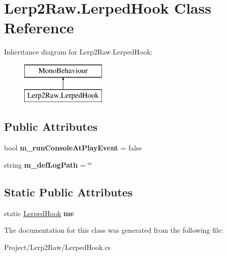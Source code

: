 \hypertarget{class_lerp2_raw_1_1_lerped_hook}{}\section{Lerp2\+Raw.\+Lerped\+Hook Class Reference}
\label{class_lerp2_raw_1_1_lerped_hook}
Inheritance diagram for Lerp2\+Raw.\+Lerped\+Hook\+:\begin{figure}[H]
\begin{center}
\leavevmode
\includegraphics[height=2.000000cm]{class_lerp2_raw_1_1_lerped_hook}
\end{center}
\end{figure}
\subsection*{Public Attributes}
\begin{DoxyCompactItemize}
\item 
\mbox{\label{class_lerp2_raw_1_1_lerped_hook_a61392d7c972a4f71d6ecdd19b203e948}} 
bool {\bfseries m\+\_\+run\+Console\+At\+Play\+Event} = false
\item 
\mbox{\label{class_lerp2_raw_1_1_lerped_hook_a9b54d718ca47a8ab4f3ae8799d2eebe9}} 
string {\bfseries m\+\_\+def\+Log\+Path} = \char`\"{}\char`\"{}
\end{DoxyCompactItemize}
\subsection*{Static Public Attributes}
\begin{DoxyCompactItemize}
\item 
\mbox{\label{class_lerp2_raw_1_1_lerped_hook_a2f2611b3846847fc308804e0a687e00b}} 
static \hyperlink{class_lerp2_raw_1_1_lerped_hook}{Lerped\+Hook} {\bfseries me}
\end{DoxyCompactItemize}


The documentation for this class was generated from the following file\+:\begin{DoxyCompactItemize}
\item 
Project/\+Lerp2\+Raw/Lerped\+Hook.\+cs\end{DoxyCompactItemize}
